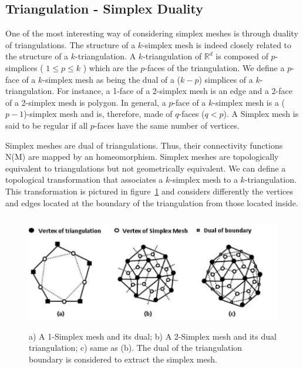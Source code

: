 \documentclass{InsightArticle}
\begin{document}
\subsection{Triangulation - Simplex Duality}
One of the most interesting way of considering simplex meshes is through duality of triangulations. The structure of a $k$-simplex mesh is indeed closely related to the structure of a $k$-triangulation. A $k$-triangulation of $\mathbb{R}^d$ is composed of $p$-simplices ( $1 \leq p \leq k$ ) which are the $p$-faces of the triangulation. We define a $p$-face of a $k$-simplex mesh as being the dual of a ($k-p$) simplices of a $k$-triangulation. For instance, a 1-face of a 2-simplex mesh is an edge and a 2-face of a 2-simplex mesh is polygon. In general, a $p$-face of a $k$-simplex mesh is a ($p-1$)-simplex mesh and is, therefore, made of $q$-faces ($q < p$). A Simplex mesh is said to be regular if all $p$-faces have the same number of vertices.

Simplex meshes are dual of triangulations. Thus, their connectivity functions N(M) are mapped by an homeomorphism. Simplex meshes are topologically equivalent to triangulations but not geometrically equivalent. We can define a topological transformation that associates a $k$-simplex mesh to a $k$-triangulation. This transformation is pictured in figure~\ref{fig:simplexMeshes} and considers differently the vertices and edges located at the boundary of the triangulation from those located inside. 
\begin{figure}
	\centering
	\includegraphics[width=150mm, height=50mm]{SimplexMesh_Examples}
	\caption{a) A 1-Simplex mesh and its dual; b) A 2-Simplex mesh and its dual triangulation; c) same as (b). The dual of the triangulation boundary is considered to extract the simplex mesh.}
	\label{fig:simplexMeshes}
\end{figure}
\end{document}
